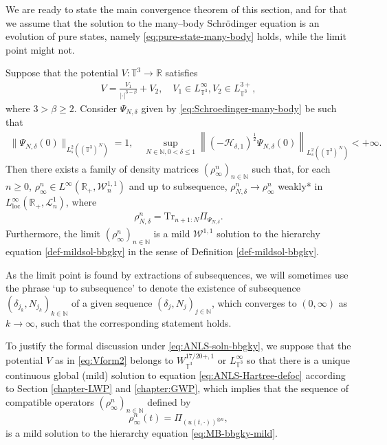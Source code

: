 We are ready to state the main convergence theorem of this section, and for that we assume that the solution to the many--body Schrödinger equation is an evolution of pure states, namely \eqref{eq:pure-state-many-body} holds, while the limit point might not.

\begin{thm}
  \label{thm:convergencehierarchy}Suppose that the potential $V :
  \mathbb{T}^3 \rightarrow \mathbb{R}$ satisfies
  \begin{align}
    V = \frac{V_1}{| \cdot |^{3 - \beta}} + V_2, \quad V_1 \in
    L_{\mathbb{T}^3}^{\infty}, V_2 \in L^{3 +}_{\mathbb{T}^3},
    \label{eq:Vform2}
  \end{align}
  where $3 > \beta \geqslant 2$. Consider $\Psi_{N, \delta}$ given by \eqref{eq:Schroedinger-many-body} be such that
  \begin{align}
    \| \Psi_{N, \delta} (0) \|_{L^2_s ((\mathbb{T}^3)^N)} = 1, \quad \sup_{N
    \in \mathbb{N}, 0 < \delta \leqslant 1} \left\| (- \mathcal{H}_{\delta,
    1})^{\frac{1}{2}} \Psi_{N, \delta} (0) \right\|_{L^2_s ((\mathbb{T}^3)^N)} < +
    \infty . \label{eq:initi-Psi-Ndelta}
  \end{align}
  Then there exists a family of density matrices
  $(\rho^n_{\infty})_{n \in \mathbb{N}}$ such that, for each $n \geqslant 0$, 
  $\rho^n_{\infty} \in L^{\infty} (\mathbb{R}_+, \mathcal{W}^{1, 1}_n)$ and up to subsequence, 
  $\rho^n_{N, \delta} \rightarrow \rho^n_{\infty}$ weakly* in
  $L^{\infty}_{\mathrm{loc}} (\mathbb{R}_+, \mathcal{L}^1_n)$, where 
  \begin{align*}
  \rho^n_{N, \delta} = \mathrm{Tr}_{n+1:N}\Pi_{\Psi_{N, \delta}}. 
  \end{align*}
   Furthermore, the limit $(\rho^n_{\infty})_{n \in \mathbb{N}}$ is a mild
  $\mathcal{W}^{1, 1}$ solution to the hierarchy equation
  \eqref{def-mildsol-bbgky} in the sense of Definition
  \ref{def-mildsol-bbgky}.
\end{thm}

\begin{nota}\label{nota:uptosub}
As the limit point is found by extractions of subsequences, we will sometimes use the phrase `up to subsequence' to denote the existence of subsequence $(\delta_{j_k},N_{j_k})_{k \in \mathbb{N}}$ of a given sequence $(\delta_{j},N_{j})_{j \in \mathbb{N}}$, which converges to $(0,\infty)$ as $k \to \infty$, such that the corresponding statement holds. 
\end{nota}

To justify the formal discussion under \eqref{eq:ANLS-soln-bbgky}, we suppose
that the potential $V$ as in \eqref{eq:Vform2} belongs to
$W_{\mathbb{T}^3}^{17/20 +, 1}$ or $L_{\mathbb{T}^3}^{\infty}$ so that there
is a unique continuous global (mild) solution to equation \eqref{eq:ANLS-Hartree-defoc} according to Section
\ref{chapter-LWP} and \ref{chapter:GWP}, which implies that the sequence of
compatible operators $(\rho^n_{\infty})_{n \in \mathbb{N}}$ defined by
\[ \rho^n_{\infty} (t) = \Pi_{(u (t, \cdot))^{\otimes n}}, \]
is a mild solution to the hierarchy equation \eqref{eq:MB-bbgky-mild}.

